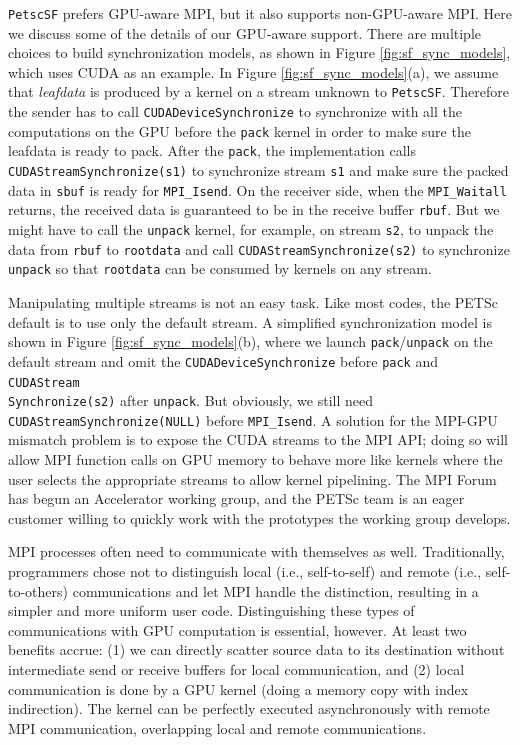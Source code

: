 \documentclass[10pt,journal,compsoc]{IEEEtran}
\begin{document}
{\tt PetscSF} prefers GPU-aware MPI, but it also supports non-GPU-aware MPI. Here we discuss some of the details of our
GPU-aware support. There are multiple choices to build synchronization models, as
shown in Figure \ref{fig:sf_sync_models}, which uses CUDA  as an example. In
Figure \ref{fig:sf_sync_models}(a), we assume that {\it leafdata} is produced by a kernel on a stream unknown to {\tt PetscSF}. Therefore the
sender has to call \texttt{CUDADeviceSynchronize} to synchronize with all the
computations on the GPU before the \texttt{pack} kernel in order to make sure the
leafdata is ready to pack. After the \texttt{pack}, the implementation calls
\texttt{CUDAStreamSynchronize(s1)} to synchronize stream \texttt{s1} and
make sure the packed data in \texttt{sbuf}
is ready for \texttt{MPI\_Isend}. 
On the receiver side, when the \texttt{MPI\_Waitall} returns, the received
data is guaranteed to be in the receive buffer \texttt{rbuf}. But we might have
to call the \texttt{unpack} kernel, for example, on stream \texttt{s2}, to unpack the data from
\texttt{rbuf} to \texttt{rootdata} and   call
\texttt{CUDAStreamSynchronize(s2)} to synchronize \texttt{unpack} so that
\texttt{rootdata} can be consumed by kernels on any stream.

Manipulating multiple streams
is not an easy task. Like most codes, the PETSc default is to use only the
default stream. A simplified synchronization model is shown in Figure
\ref{fig:sf_sync_models}(b), where we launch \texttt{pack}/\texttt{unpack} on
the default stream and omit the \texttt{CUDADeviceSynchronize} before
\texttt{pack} and \texttt{CUDAStream\\Synchronize(s2)} after \texttt{unpack}. But
obviously, we still need 
\texttt{CUDAStreamSynchronize(NULL)} 
before \texttt{MPI\_Isend}.
A solution for the MPI-GPU mismatch problem is to expose the CUDA streams to the MPI API; doing so will allow MPI function calls on GPU memory
to behave more like kernels where the user selects the appropriate streams to allow
kernel pipelining. 
The MPI Forum has begun an Accelerator working group, and the PETSc team is an eager
customer willing to quickly work with the prototypes the working group develops.  

MPI processes often need to communicate with themselves as
well. Traditionally, programmers chose not to distinguish local (i.e., self-to-self) and remote (i.e., self-to-others) communications and let MPI handle the distinction, resulting in a simpler and more uniform user code.  Distinguishing these types of communications with GPU computation is essential, however. At least two benefits accrue: (1) we can directly scatter source data to its destination
without intermediate send or receive buffers for local communication, and (2) local communication is done by a GPU kernel (doing a memory copy with index indirection). The
kernel can be perfectly executed asynchronously with remote MPI
communication, overlapping local and remote communications.
\end{document}
